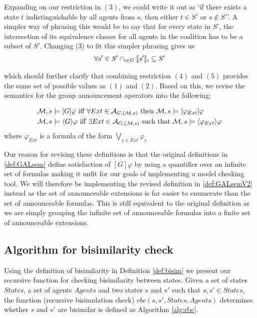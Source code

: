 Expanding on our restriction in $(3)$, we could write it out as `if there exists a state $t$ indistinguishable by all agents from $s$, then either $t\in S'$ or $s\not\in S'$'. A simpler way of phrasing this would be to say that for every state in $S'$, the intersection of its equivalence classes for all agents in the coalition has to be a subset of $S'$. Changing (3) to fit this simpler phrasing gives us
\begin{align}
	\forall s'\in S' \cap_{i\in G}\llbracket s'\rrbracket_i\subseteq S'
\end{align}

which should further clarify that combining restriction $(4)$ and $(5)$ provides the same set of possible values as $(1)$ and $(2)$. Based on this, we revise the semantics for the group announcement operators into the following:

\begin{definition}
	\label{def:GALsemV2}
	\begin{align*}
		\mathcal{M},s & \models [G]\varphi \textrm{ iff }  \forall Ext\in\mathcal{A}_{G,(\mathcal{M},s)} \textrm{ then } \mathcal{M},s\models [\varphi_{Ext}]\varphi\\
		\mathcal{M},s & \models \langle G\rangle\varphi \textrm{ iff } \exists Ext\in\mathcal{A}_{G,(\mathcal{M},s)} \textrm{ such that } \mathcal{M},s\models \langle\varphi_{Ext}\rangle\varphi
	\end{align*}
	where $\varphi_{Ext}$ is a formula of the form $\bigvee_{s\in Ext}\varphi_{s}$
\end{definition}

Our reason for revising these definitions is that the original definitions in \ref{def:GALsem} define satisfaction of $[G]\varphi$ by using a quantifier over an infinite set of formulas making it unfit for our goals of implementing a model checking tool. We will therefore be implementing the revised definition in \ref{def:GALsemV2} instead as the set of announceable extensions is far easier to enumerate than the set of announceable formulas. This is still equivalent to the original definition as we are simply grouping the infinite set of announceable formulas into a finite set of announceable extensions.

\subsection{Algorithm for bisimilarity check}

Using the definition of bisimilarity in Definition \ref{def:bisim} we present our recursive function for checking bisimilarity between states. Given a set of states $States$, a set of agents $Agents$ and two states $s$ and $s'$ such that $s, s' \in States$, the function (recursive bisimulation check) $rbc(s,s',States, Agents)$ determines whether $s$ and $s'$ are bisimilar is defined as Algorithm \ref{alg:rbc}.

